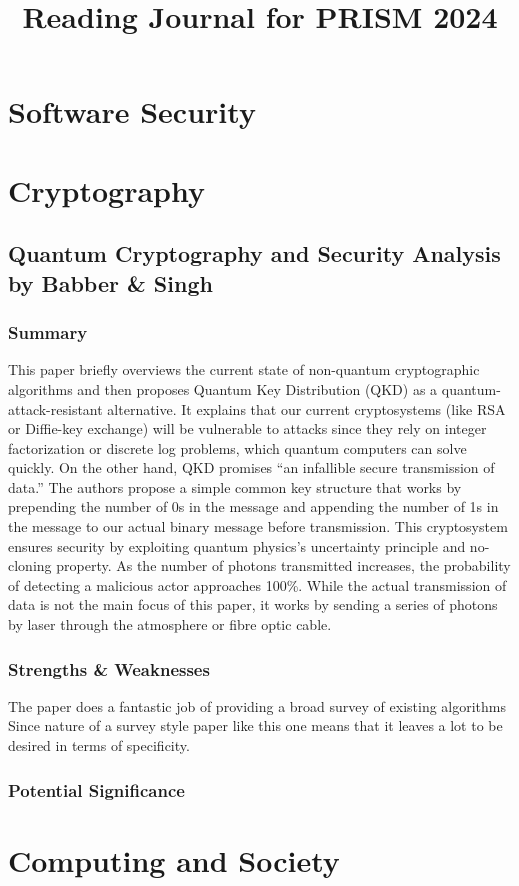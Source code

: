 \documentclass{article}
\begin{document}

\title{Reading Journal for PRISM 2024}
\author{}
\date{}
\maketitle

\section{Software Security}

\section{Cryptography}
\subsection*{Quantum Cryptography and Security Analysis by Babber \& Singh}

\subsubsection*{Summary}
This paper briefly overviews the current state of non-quantum cryptographic algorithms and then proposes Quantum Key Distribution (QKD) as a quantum-attack-resistant alternative. It explains that our current cryptosystems (like RSA or Diffie-key exchange) will be vulnerable to attacks since they rely on integer factorization or discrete log problems, which quantum computers can solve quickly. On the other hand, QKD promises “an infallible secure transmission of data.” The authors propose a simple common key structure that works by prepending the number of 0s in the message and appending the number of 1s in the message to our actual binary message before transmission. This cryptosystem ensures security by exploiting quantum physics's uncertainty principle and no-cloning property. As the number of photons transmitted increases, the probability of detecting a malicious actor approaches 100\%. While the actual transmission of data is not the main focus of this paper, it works by sending a series of photons by laser through the atmosphere or fibre optic cable. 

\subsubsection*{Strengths \& Weaknesses}
The paper does a fantastic job of providing a broad survey of existing algorithms 
Since nature of a survey style paper like this one means that it leaves a lot to be desired in terms of specificity. 

\subsubsection*{Potential Significance}

\section{Computing and Society}

\end{document}
